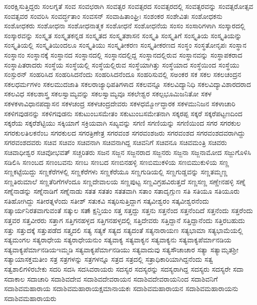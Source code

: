 {ಸಂರಕ್ಷಿಸುತ್ತಿದ್ದರು
ಸಂಲಗ್ನತೆ
ಸಂವ
ಸಂವಛರಾಗಿ
ಸಂವತ್ಸರ
ಸಂವತ್ಸರದ
ಸಂವತ್ಸರದಲ್ಲಿ
ಸಂವತ್ಸರವನ್ನು
ಸಂವತ್ಸರೋತ್ಸವ
ಸಂವತ್ಸವರ
ಸಂವರಿಸಿ
ಸಂವರ್ದ್ಧತಾಂ
ಸಂವಸನ್
ಸಂವಾಹಿತಾಂಘ್ರಿಃ
ಸಂಶಂಕರ
ಸಂಶೇವಿತಃ
ಸಂಶೋಧಕನು
ಸಂಶೋಧಕರು
ಸಂಶೋಧನಾ
ಸಂಶೋಧನಾತ್ಮಕ
ಸಂಶೋಧನೆ
ಸಂಶೋಧನೆಯ
ಸಂಸಂ
ಸಂಸಾರಿಗಳಾಗಿ
ಸಂಸ್ಕಾರದಲ್ಲಿ
ಸಂಸ್ಕಾರವನ್ನು
ಸಂಸ್ಕೃತ
ಸಂಸ್ಕೃತಕನ್ನಡ
ಸಂಸ್ಕೃತದ
ಸಂಸ್ಕೃತಶಾಸನ
ಸಂಸ್ಕೃತಿ
ಸಂಸ್ಕೃತಿಗೆ
ಸಂಸ್ಕೃತಿಯ
ಸಂಸ್ಕೃತಿಯನ್ನು
ಸಂಸ್ಕೃತಿಯಲ್ಲಿ
ಸಂಸ್ಕೃತಿಯಿಂದಲೂ
ಸಂಸ್ಕೃತಿಯು
ಸಂಸ್ಕೃತೀಕರಣ
ಸಂಸ್ಕೃತೀಕರಣದ
ಸಂಸ್ಥಂ
ಸಂಸ್ಥತೋನೃಪಃ
ಸಂಸ್ಥಾನ
ಸಂಸ್ಥಾನಂ
ಸಂಸ್ಥಾನಕ್ಕೆ
ಸಂಸ್ಥಾನದ
ಸಂಸ್ಥಾನದಲ್ಲಿ
ಸಂಸ್ಥಾನದಲ್ಲಿದ್ದ
ಸಂಸ್ಥಾನದಲ್ಲಿರುವ
ಸಂಸ್ಥಾನವನ್ನು
ಸಂಸ್ಥಾಪಕರಾದ
ಸಂಸ್ಥಾಪಿತರಾದರು
ಸಂಸ್ಥೆಯ
ಸಂಸ್ಥೆಯಲ್ಲಿ
ಸಂಸ್ಥೆಯಲ್ಲಿರುವ
ಸಂಸ್ಥೆಯಾಗಿತ್ತು
ಸಂಸ್ಥೆಯಾದ
ಸಂಸ್ಥೆಯಿಂದ
ಸಂಸ್ಥೆಯು
ಸಂಸ್ಫುರನ್
ಸಂಹರಿಸಿದ
ಸಂಹರಿಸಿದನೆಂದು
ಸಂಹರಿಸಿದನೆಂದೂ
ಸಂಹರಿಸುವಲ್ಲಿ
ಸಅಂಕರ
ಸಕ
ಸಕಲ
ಸಕಲಚಂದ್ರನ
ಸಕಲಧರ್ಮಗಳಂ
ಸಕಲಮುದಜಾತಿ
ಸಕಲರಾಜ್ಯಾಧಿಪತಿಗಳಾದ
ಸಕಲವನ್ನೂ
ಸಕಲವಿದ್ಯಾನಿಧಿ
ಸಕಲವಿದ್ಯಾವಿಶಾರದರಾದ
ಸಕಲವಿಧ
ಸಕಲಶಾಸ್ತ್ರ
ಸಕಲಸ್ವಾಮ್ಯವನ್ನು
ಸಕಲಸ್ವಾಮ್ಯವೂ
ಸಕಲೇಶ್ವರ
ಸಕಲ್ಪಭೂಮಿಜನಿತೋ
ಸಕಳ
ಸಕಳಕಳಾವಿಧಾನಪದ್ಮಾಸನ
ಸಕಳಚಂದ್ರ
ಸಕಳಚಂದ್ರದೇವರು
ಸಕಳಧರ್ಮ್ಮೋದ್ಧಾರಕ
ಸಕಳಮುನಿಜನ
ಸಕಳಾಚಾರಿ
ಸಕಳಿಗವುಡನನ್ನು
ಸಕಳಿಗವುಡನು
ಸಕುಟುಂಬಸಮೇತಂ
ಸಕುಟುಂಬಸಮೇತನಾಗಿ
ಸಕ್ಕರಪ್ಪ
ಸಕ್ಕರೆ
ಸಕ್ಕರೆಪಟ್ಟಣದಿಂದ
ಸಕ್ಕರೆಯ
ಸಕ್ಕರೆಶೆಟ್ಟಿಯು
ಸಕ್ಕಿಯಾಗೆ
ಸಕ್ರಿಯವಾಗಿ
ಸಖ್ಯವನ್ನು
ಸಗಣಿ
ಸಗಣಿಯನ್ನು
ಸಗಣಿಯಿಂದ
ಸಗರ
ಸಗರಕುಲ
ಸಗರಕುಲತಿಲಕನೆಂಬ
ಸಗರಕುಲದ
ಸಗರತ್ರಿಣೇತ್ರ
ಸಗರವಂಶ
ಸಗರವಂಶಜರು
ಸಗರವಂಶದ
ಸಗರವಂಶದವರಾಗಿದ್ದು
ಸಗರವಂಶದವರು
ಸಚಿವ
ಸಚಿವಂ
ಸಚಿವನಾಗಿ
ಸಚಿವನಾಗಿದ್ದ
ಸಚಿವನಿಗೆ
ಸಚಿವನೂ
ಸಚಿವಮಂತ್ರಿ
ಸಚಿವರು
ಸಚಿವಾಧೀಶ್ವರ
ಸಚಿವೋಭವತ್
ಸಚ್ಚರಿತರು
ಸಜನ
ಸಜ್ಜನ
ಸಜ್ಜನರಾದ
ಸಜ್ಜನರು
ಸಜ್ಜನಾ
ಸಜ್ಜನಾಮೋದ
ಸಜ್ಜುಗೊಳಿಸಿ
ಸಡಿಲಿಸಿ
ಸಣಂಬದ
ಸಣಂಬವನು
ಸಣಬ
ಸಣಬದ
ಸಣಬಿನಹಳ್ಳಿ
ಸಣಬಿಮುಕಳಿಯ
ಸಣಬಿಮುಕುಳಿಯ
ಸಣ್ಣ
ಸಣ್ಣಕಟ್ಟೆಯಿದ್ದು
ಸಣ್ಣಕೆರೆಗಳಲ್ಲಿ
ಸಣ್ಣಕೆರೆಗಳು
ಸಣ್ಣಕೆರೆಯೂ
ಸಣ್ಣಗುಡಿಯಲ್ಲಿ
ಸಣ್ಣಗುಡ್ಡವನ್ನು
ಸಣ್ಣತಮ್ಮಣ್ಣ
ಸಣ್ಣತಿರುಮಾಲೆ
ಸಣ್ಣತೆರಿಗೆಗಳೆಂದೂ
ಸಣ್ಣದೇವಾಲಯ
ಸಣ್ಣಪುಟ್ಟ
ಸಣ್ಣವಿಗ್ರಹವಿರುತ್ತದೆ
ಸಣ್ಣಸಣ್ಣ
ಸಣ್ಣೇನಹಳ್ಳಿ
ಸಣ್ನೆ
ಸಣ್ನೆನಾಡನ್ನು
ಸಣ್ನೆನಾಡಿಗೆ
ಸಣ್ನೆನಾಡು
ಸತತ
ಸತತಂ
ಸತತವಾಗಿ
ಸತಾಂ
ಸತಾದೃಗ್ಗುಣ
ಸತಿ
ಸತಿಯೂ
ಸತಿಯೂರು
ಸತಿಹೋಗಿದ್ದು
ಸತೀರತ್ನಳೆಂದು
ಸತೀಶ್
ಸತುಕವಿ
ಸತ್ಕರಿಸುತ್ತಿದ್ದಾಗ
ಸತ್ಕವೀಶ್ವರಂ
ಸತ್ಕವೀಶ್ವರನೆಂದು
ಸತ್ಕಾರ್ಯನಿರತವಾಗುವಂತೆ
ಸತ್ಕುಲ
ಸತ್ಕ್ಷಾನ್ತಿಯಂ
ಸತ್ತ
ಸತ್ತದ್ದು
ಸತ್ತನು
ಸತ್ತನೆಂದ
ಸತ್ತನೆಂದಿದೆ
ಸತ್ತನೆಂದು
ಸತ್ತರೆಂದು
ಸತ್ತವರ
ಸತ್ತವೀರರು
ಸತ್ತಾಗ
ಸತ್ತಿಗನಹಳ್ಳದ
ಸತ್ತಿಗನಹಳ್ಳದಲ್ಲಿ
ಸತ್ತಿದೇವರು
ಸತ್ತಿದ್ದಾನೆ
ಸತ್ತಿದ್ದಾನೆಂದು
ಸತ್ತಿರಬಹುದು
ಸತ್ತು
ಸತ್ತುದಕ್ಕೆ
ಸತ್ತುಪಡೆದ
ಸತ್ತ್ಯದಲಿ
ಸತ್ಯ
ಸತ್ಯಕೆ
ಸತ್ಯದ
ಸತ್ಯದಂತೆ
ಸತ್ಯನಾರಾಯಣ
ಸತ್ಯಭಾಮಾ
ಸತ್ಯಭಾಮೆಯಲ್ಲಿ
ಸತ್ಯಮಂಗಲ
ಸತ್ಯರಾಧೇಯ
ಸತ್ಯರಾಧೇಯನುಂ
ಸತ್ಯವಾಕ್ಯ
ಸತ್ಯವಾಕ್ಯನ
ಸತ್ಯವಾಕ್ಯನು
ಸತ್ಯವಾಕ್ಯಪೆರ್ಮಾನಡಿಯ
ಸತ್ಯವಾಕ್ಯಪೆರ್ಮಾನಡಿಯಇಮ್ಮಡಿ
ಸತ್ಯವಾಕ್ಯಪೆರ್ಮಾನಡಿಯು
ಸತ್ಯವಾದುವು
ಸತ್ಯಸೌಚಾಚಾರ
ಸತ್ಯಾ
ಸತ್ಯಾಮೃತಶ್ರೀ
ಸತ್ಯಾಯಾಸಕ್ತಮತೀಂ
ಸತ್ರ
ಸತ್ರಗಳನ್ನು
ಸತ್ರಗಳನ್ನೂ
ಸತ್ರದ
ಸತ್ರದಲ್ಲಿ
ಸತ್ರಾಧಿಕಾರಿಯಾಗಿದ್ದನೆಂದು
ಸತ್ವ
ಸತ್ವಶಾಲಿಗಳಿರಬೇಕು
ಸದರಿ
ಸದಸಿ
ಸದಸಿವರಾಯರು
ಸದಸ್ಯರ
ಸದಸ್ಯರನ್ನು
ಸದಸ್ಯರಾಗಿದ್ದ
ಸದಸ್ಯರು
ಸದಸ್ಯರೇ
ಸದಾ
ಸದಾಕಾಲ
ಸದಾಚಾರಿ
ಸದಾಶಿವದೇವ
ಸದಾಶಿವದೇವರಾಯನ
ಸದಾಶಿವದೇವರಾಯನಿಂದ
ಸದಾಶಿವನಿಗೆ
ಸದಾಶಿವಮಹಾರಾಯ
ಸದಾಶಿವಮಹಾರಾಯಕ್ಷಮಾನಾಯಕಃ
ಸದಾಶಿವಮಹಾರಾಯನ
ಸದಾಶಿವಮಹಾರಾಯನು
ಸದಾಶಿವಮಹಾರಾಯರು
}
